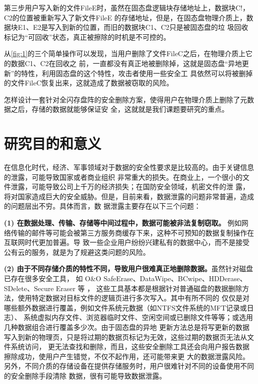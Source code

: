 第三步用户写入新的文件FileE时，虽然在固态盘逻辑块存储地址上，数据块C!，C2的位置被重新写入了新文件FileE
的存储地址，但是，在固态盘物理介质上，数据块E1、E2是写入到新的位置，而旧的数据块C1、C2只是被固态盘的垃
圾回收标记为“可回收”状态，真正被擦除的时机是不可控的。


从\autoref{fig:1}的三个简单操作可以发现，当用户删除了文件FileC之后，在物理介质上它的数据C1、C2在回收之
前，一直都没有真正地被删除掉，这就是固态盘“异地更新”的特性，利用固态盘的这个特性，攻击者使用一些安全工
具依然可以将被删掉的文件FileC恢复出来，这就造成了数据被窃取的风险。


怎样设计一套针对全闪存盘阵的安全删除方案，使得用户在物理介质上删除了元数据之后，存储的数据就能够保证安
全，这就就是我们课题要研究的重点。
\section{研究目的和意义}
在信息化时代，经济、军事领域对于数据的安全性要求是比较高的。由于关键信息的泄露，可能导致国家或者商业组织
非常重大的损失。在商业上，一个很小的文件泄露，可能导致公司上千万的经济损失；在国防安全领域，机密文件的泄
露，将对国家造成巨大的安全威胁。但是，目前来看，数据泄露的问题非常普遍，造成的问题层出不穷。具体而言，数
据泄露主要存在以下三个问题：


\textbf{(1) 在数据处理、传输、存储等中间过程中，数据可能被非法复制窃取。}
例如网络传输的邮件等可能会被第三方服务商缓存下来，这种不可预知的数据复制操作在互联网时代更加普遍。导
致一些企业用户纷纷兴建私有的数据中心，而不是接受公有云的服务，就是为了规避这类问题的风险。


\textbf{(2) 由于不同存储介质的特性不同，导致用户很难真正地删除数据。}虽然针对磁盘已存在很多安全工具，
如 O\&O SafeErase、DataWipe、BCwipe、HDDerase、SDelete、Secure Eraser 等\cite{safe-erase,secure-eraser,bcwipe} ，
这些工具基本都是根据针对普通磁盘的数据删除方法，使用特定数据对目标文件的逻辑页进行多次写入。其中有所不同的
仅仅是对哪些额外数据进行覆盖，例如文件系统元数据（如NTFS文件系统的MFT记录或日志）\cite{Huebner2006Data}、
系统虚拟内存文件、浏览器临时文件、空闲空间或已删除文件等等；或选用几种数据组合进行覆盖多少次。由于固态盘的异地
更新方法总是将写更新的数据写入到新的物理页，只是将过期的数据页标记为无效，这些过期的数据页无法从文件系统访问，
更无法查找和删除，而且，这些安全删除工具还会向用户报告数据擦除成功，使用户产生错觉，不仅不起作用，还可能带来更
大的数据泄露风险。另外，不同介质的存储设备在提供存储服务时，用户很难针对不同的设备使用不同的安全删除手段清除
数据，很有可能导致数据泄露。


